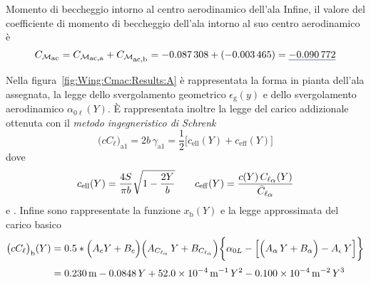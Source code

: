 \documentclass[[12pt,twoside]{book}
\begin{document}
\begin{myExampleX}{Momento di beccheggio intorno al centro aerodinamico dell'ala}{}
Infine, il valore del coefficiente di momento di beccheggio dell'ala intorno al suo centro aerodinamico
è
\[
C_{\mathcal{M}_\mathlarger{\mathrm{ac}}} 
  = C_{\mathcal{M}_\mathlarger{\mathrm{ac,a}}} + C_{\mathcal{M}_\mathlarger{\mathrm{ac,b}}}
  = \SI[round-precision=4]{\myCmZeroAWing}{} 
    +
    ( \SI[round-precision=5]{\myCmZeroBWing}{} )
  = \mathunderline{mydarkblue}{ \SI[round-precision=4]{\myCmZeroWing}{} }
\]

Nella figura~\ref{fig:Wing:Cmac:Results:A} è rappresentata la forma in pianta dell'ala assegnata,
la legge dello svergolamento geometrico $\epsilon_\mathrm{g}(y)$ e dello svergolamento
aerodinamico $\alpha_{0\ell}(Y)$.
È rappresentata inoltre la legge del carico addizionale ottenuta con il \emph{metodo ingegneristico di Schrenk}
\[
\big( cC_\ell \big)_\mathrm{a1} = 2b \, \gamma_\mathrm{a1}
  = \frac{1}{2} \Big[ c_\mathrm{ell}(Y) + c_\mathrm{eff}(Y) \Big]
\]
dove
\[
c_\mathrm{ell}(Y) = \frac{4S}{\pi b} \sqrt{1 - \frac{2Y}{b}}
\qquad
c_\mathrm{eff}(Y) = \frac{ c(Y) \, C_{\ell_\mathlarger{\alpha}}(Y) }{ \bar{C}_{\ell_\mathlarger{\alpha}} }
\]
%
e 
.
%
Infine sono rappresentate la funzione $x_\mathrm{b}(Y)$ e la legge approssimata del carico basico
\[
\begin{split}
\big( cC_\ell \big)_\mathrm{b} (Y)
  & {}=
    0.5*\Big( A_c Y + B_c \Big)
      \Big( A_{C_{\ell_\alpha}} \, Y + B_{C_{\ell_\alpha}} \Big)
    \bigg\{ \alpha_{0L} 
      - \Big[ \Big( A_{\alpha} \, Y + B_{\alpha} \Big) - A_{\epsilon} \, Y \Big]
    \bigg\}
\\[3pt]
  & {}=
      \SI[round-mode=figures,round-precision=3,
        ]{\myCoeffIWing}{\metre}
      \SI[round-mode=figures,round-precision=3,
        ]{\myCoeffJWing}{}\, Y
      +
      \SI[round-mode=figures,round-precision=3,
        fixed-exponent=-4,
        scientific-notation=fixed %
        ]{\myCoeffKWing}{\metre^{-1}}\, Y^2
      \SI[round-mode=figures,round-precision=3,
        fixed-exponent=-4,
        scientific-notation=fixed
        ]{\myCoeffLWing}{\metre^{-2}}\, Y^3
\end{split}
\]

\end{myExampleX}
\end{document}

